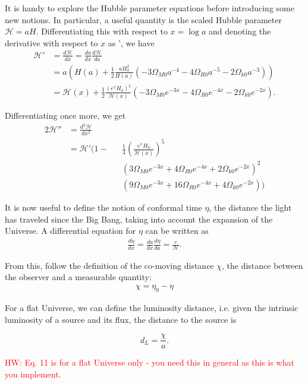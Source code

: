 \documentclass{aa}
\newcommand{\hw}[1]{\textcolor{red}{HW: #1}}
\begin{document}
It is handy to explore the Hubble parameter equations before introducing some new notions. In particular, a useful quantity is the scaled Hubble parameter $\mathcal H = aH$. Differentiating this with respect to $x = \log a$ and denoting the derivative with respect to $x$ as ', we have
\begin{align}
    \mathcal H' &= \frac{d\mathcal H}{dx} = \frac{da}{dx}\frac{d\mathcal H}{da}\\ 
    &= a\left( H(a) + \frac{1}{2}\frac{aH_0^2}{ H(a)} (-3\Omega_{M0} a^{-4} - 4\Omega_{R0}a^{-5}-2\Omega_{k0}a^{-3})\right)\\
    &= \mathcal H(x) +\frac{1}{2}\frac{(e^xH_0)^2}{\mathcal H(x)}(-3\Omega_{M0} e^{-3x} - 4 \Omega_{R0}e^{-4x}-2\Omega_{k0}e^{-2x}).
\end{align}

Differentiating once more, we get
\begin{alignat*}{2}
    \mathcal H'' &= \frac{d^2\mathcal H}{dx^2}&&\\ 
    &= \mathcal H'\Bigg(1-&&\frac{1}{4}\left(\frac{e^xH_0}{\mathcal H(x)}\right)^5\\
    & &&(3\Omega_{M0}e^{-3x}+4\Omega_{R0}e^{-4x}+2\Omega_{k0}e^{-2x})^2\\
    & &&(9\Omega_{M0}e^{-3x}+16\Omega_{R0}e^{-4x}+4\Omega_{k0}e^{-2x})\Bigg)
\end{alignat*}

It is now useful to define the notion of conformal time $\eta$, the distance the light has traveled since the Big Bang, taking into account the expansion of the Universe. A differential equation for $\eta$ can be written as
\begin{align}
\frac{d\eta}{dx} = \frac{da}{dx}\frac{d\eta}{da} = \frac{c}{\mathcal{H}}.
\end{align}

From this, follow the definition of the co-moving distance $\chi$, the distance between the observer and a measurable quantity:
\begin{align}
\chi = \eta_0 - \eta
\end{align}

For a flat Universe, we can define the luminosity distance, i.e. given the intrinsic luminosity of a source and its flux, the distance to the source is

\begin{equation}
    d_L = \frac{\chi}{a}.
\end{equation}

\hw{Eq. 11 is for a flat Universe only - you need this in general as this is what you implement.}
\end{document}

